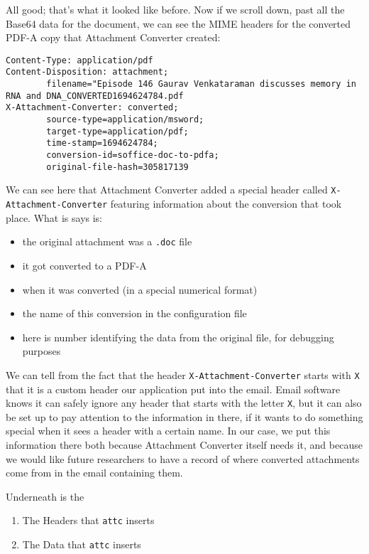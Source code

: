 \documentclass[11pt]{article}
\begin{document}
All good; that's what it looked like before.  Now if we scroll down,
past all the Base64 data for the document, we can see the MIME headers
for the converted PDF-A copy that Attachment Converter created:

\footnotesize

\begin{verbatim}
Content-Type: application/pdf
Content-Disposition: attachment;
        filename="Episode 146 Gaurav Venkataraman discusses memory in RNA and DNA_CONVERTED1694624784.pdf
X-Attachment-Converter: converted;
        source-type=application/msword;
        target-type=application/pdf;
        time-stamp=1694624784;
        conversion-id=soffice-doc-to-pdfa;
        original-file-hash=305817139
\end{verbatim}

\normalsize

We can see here that Attachment Converter added a special header
called \texttt{X-Attachment-Converter} featuring information about the
conversion that took place.  What is says is:

\begin{itemize}
\item the original attachment was a \texttt{.doc} file
\item it got converted to a PDF-A
\item when it was converted (in a special numerical format)
\item the name of this conversion in the configuration file
\item here is number identifying the data from the
original file, for debugging purposes
\end{itemize}

We can tell from the fact that the header \texttt{X-Attachment-Converter}
starts with \texttt{X} that it is a custom header our application put into
the email.  Email software knows it can safely ignore any header that
starts with the letter \texttt{X}, but it can also be set up to pay attention
to the information in there, if it wants to do something special when
it sees a header with a certain name.  In our case, we put this
information there both because Attachment Converter itself needs it,
and because we would like future researchers to have a record of where
converted attachments come from in the email containing them.

Underneath is the 

\begin{enumerate}
\item The Headers that \texttt{attc} inserts
\label{sec:orged0c22c}

\item The Data that \texttt{attc} inserts
\label{sec:orgb68480c}
\end{enumerate}
\end{document}
